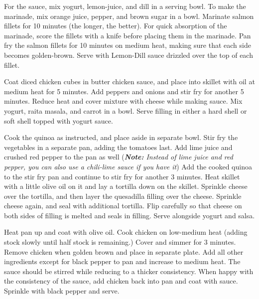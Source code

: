 \documentclass[oneside]{recipe}
\begin{document}
For the sauce, mix yogurt, lemon-juice, and dill in a serving bowl. 
To make the marinade, mix orange juice, pepper, and brown sugar in a bowl. Marinate salmon fillets for 10 minutes (the longer, the better). For quick absorption of the marinade, score the fillets with a knife before placing them in the marinade. 
Pan fry the salmon fillets for 10 minutes on medium heat, making sure that each side becomes golden-brown. Serve with Lemon-Dill sauce drizzled over the top of each fillet. 


Coat diced chicken cubes in butter chicken sauce, and place into skillet with oil at medium heat for 5 minutes. Add peppers and onions and stir fry for another 5 minutes. Reduce heat and cover mixture with cheese while making sauce.
Mix yogurt, raita masala, and carrot in a bowl. Serve filling in either a hard shell or soft shell topped with yogurt sauce. 


Cook the quinoa as instructed, and place aside in separate bowl. Stir fry the vegetables in a separate pan, adding the tomatoes last. Add lime juice and crushed red pepper to the pan as well (\textit{\textbf{Note: } Instead of lime juice and red pepper, you can also use a chili-lime sauce if you have it}) Add the cooked quinoa to the stir fry pan and continue to stir fry for another 3 minutes. Heat skillet with a little olive oil on it and lay a tortilla down on the skillet. Sprinkle cheese over the tortilla, and then layer the quesadilla filling over the cheese. Sprinkle cheese again, and seal with additional tortilla. Flip carefully so that cheese on both sides of filling is melted and seals in filling. Serve alongside yogurt and salsa. 


Heat pan up and coat with olive oil. Cook chicken on low-medium heat (adding stock slowly until half stock is remaining.) Cover and simmer for 3 minutes. Remove chicken when golden brown and place in separate plate. Add all other ingredients except for black pepper to pan and increase to medium heat. The sauce should be stirred while reducing to a thicker consistency. When happy with the consistency of the sauce, add chicken back into pan and coat with sauce. Sprinkle with black pepper and serve. 
\end{document}
